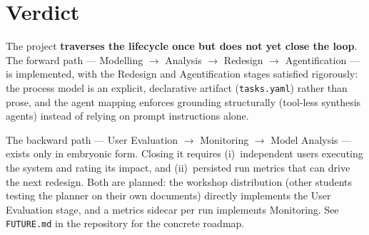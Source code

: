 \documentclass[11pt,a4paper]{article}
\begin{document}
\section{Verdict}

The project \textbf{traverses the lifecycle once but does not yet close the
loop}. The forward path --- Modelling $\rightarrow$ Analysis $\rightarrow$
Redesign $\rightarrow$ Agentification --- is implemented, with the
Redesign and Agentification stages satisfied rigorously: the process model is
an explicit, declarative artifact (\texttt{tasks.yaml}) rather than prose, and
the agent mapping enforces grounding structurally (tool-less synthesis agents)
instead of relying on prompt instructions alone.

The backward path --- User Evaluation $\rightarrow$ Monitoring $\rightarrow$
Model Analysis --- exists only in embryonic form. Closing it requires
(i)~independent users executing the system and rating its impact, and
(ii)~persisted run metrics that can drive the next redesign. Both are planned:
the workshop distribution (other students testing the planner on their own
documents) directly implements the User Evaluation stage, and a metrics
sidecar per run implements Monitoring. See \texttt{FUTURE.md} in the
repository for the concrete roadmap.
\end{document}
